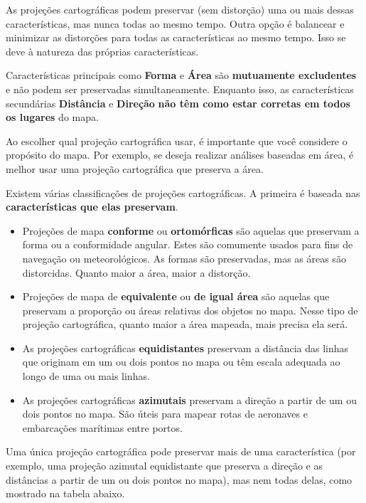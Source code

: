 \documentclass[
]{krantz}
\providecommand{\tightlist}{%
  \setlength{\itemsep}{0pt}\setlength{\parskip}{0pt}}
\begin{document}
As projeções cartográficas podem preservar (sem distorção) uma ou mais dessas características, mas nunca todas ao mesmo tempo. Outra opção é balancear e minimizar as distorções para todas as características ao mesmo tempo. Isso se deve à natureza das próprias características.

Características principais como \textbf{Forma} e \textbf{Área} são \textbf{mutuamente excludentes} e não podem ser preservadas simultaneamente. Enquanto isso, as características secundárias \textbf{Distância} e \textbf{Direção} \textbf{não têm como estar corretas em todos os lugares} do mapa.

Ao escolher qual projeção cartográfica usar, é importante que você considere o propósito do mapa. Por exemplo, se deseja realizar análises baseadas em área, é melhor usar uma projeção cartográfica que preserva a área.

Existem várias classificações de projeções cartográficas. A primeira é baseada nas \textbf{características que elas preservam}.

\begin{itemize}
\tightlist
\item
  Projeções de mapa \textbf{conforme} ou \textbf{ortomórficas} são aquelas que preservam a forma ou a conformidade angular. Estes são comumente usados para fins de navegação ou meteorológicos. As formas são preservadas, mas as áreas são distorcidas. Quanto maior a área, maior a distorção.
\item
  Projeções de mapa de \textbf{equivalente} ou \textbf{de igual área} são aquelas que preservam a proporção ou áreas relativas dos objetos no mapa. Nesse tipo de projeção cartográfica, quanto maior a área mapeada, mais precisa ela será.
\item
  As projeções cartográficas \textbf{equidistantes} preservam a distância das linhas que originam em um ou dois pontos no mapa ou têm escala adequada ao longo de uma ou mais linhas.
\item
  As projeções cartográficas \textbf{azimutais} preservam a direção a partir de um ou dois pontos no mapa. São úteis para mapear rotas de aeronaves e embarcações marítimas entre portos.
\end{itemize}

Uma única projeção cartográfica pode preservar mais de uma característica (por exemplo, uma projeção azimutal equidistante que preserva a direção e as distâncias a partir de um ou dois pontos no mapa), mas nem todas delas, como mostrado na tabela abaixo.
\end{document}
